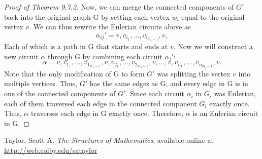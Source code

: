 \begin{proof}[Proof of Theorem 9.7.2]
    Now, we can merge the connected components of $G'$ back into the original graph G by setting each vertex $w_i$ equal to the original vertex $v$. We can thus rewrite the Eulerian circuits above as
    \[
    \alpha_{ij}'=v, v_{i_1},...,v_{i_{m_i-1}}, v,
    \]
    Each of which is a path in G that starts and ends at $v$. Now we will construct a new circuit $\alpha$ through G by combining each circuit $\alpha_i'$:
    \[
    \alpha=v, v_{1_1},...,v_{1_{m_1-1}}, v, v_{2_1},...,v_{2_{m_2-1}}, v,...,v, v_{n_1},...,v_{n_{m_i-1}}, v.
    \]
    Note that the only modification of G to form $G'$ was splitting the vertex $v$ into multiple vertices. Thus, $G'$ has the same edges as G, and every edge in G is in one of the connected components of $G'$. Since each circuit $\alpha_i$ in $G_i$ was Eulerian, each of them traversed each edge in the connected component $G_i$ exactly once. Thus, $\alpha$ traverses each edge in G exactly once. Therefore, $\alpha$ is an Eulerian circuit in G. 
    \end{proof}
    
	
	\begin{thebibliography}{99}
	  Taylor, Scott A. \emph{The Structures of Mathematics}, available online at \url{http://web.colby.edu/sataylor}

	
	\end{thebibliography}
	




















